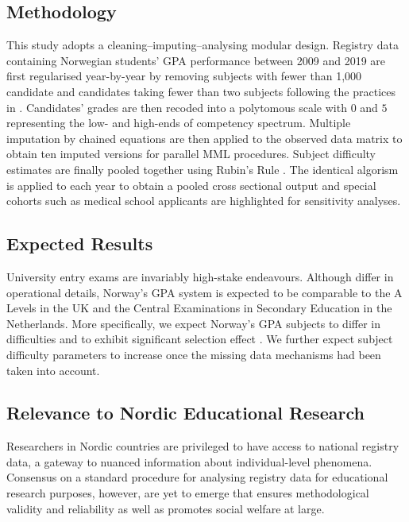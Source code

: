 \subsection{Methodology}

This study adopts a cleaning--imputing--analysing modular design. Registry data containing Norwegian students' GPA performance between 2009 and 2019 are first regularised year-by-year by removing subjects with fewer than 1,000 candidate and candidates taking fewer than two subjects following the practices in \textcite{he:2018}. Candidates' grades are then recoded into a polytomous scale with $0$ and $5$ representing the low- and high-ends of competency spectrum. Multiple imputation by chained equations are then applied to the observed data matrix to obtain ten imputed versions for parallel MML procedures. Subject difficulty estimates are finally pooled together using Rubin's Rule \parencite{rubin:1987}. The identical algorism is applied to each year to obtain a pooled cross sectional output and special cohorts such as medical school applicants are highlighted for sensitivity analyses.

\subsection{Expected Results}

University entry exams are invariably high-stake endeavours. Although differ in operational details, Norway's GPA system is expected to be comparable to the A Levels in the UK and the Central Examinations in Secondary Education in the Netherlands. More specifically, we expect Norway's GPA subjects to differ in difficulties \parencite[per report by][]{he:2018} and to exhibit significant selection effect \parencite[as demonstrated in][]{korobko:2008}. We further expect subject difficulty parameters to increase once the missing data mechanisms had been taken into account.

\subsection{Relevance to Nordic Educational Research}

Researchers in Nordic countries are privileged to have access to national registry data, a gateway to nuanced information about individual-level phenomena. Consensus on a standard procedure for analysing registry data for educational research purposes, however, are yet to emerge that ensures methodological validity and reliability as well as promotes social welfare at large.

\printbibliography